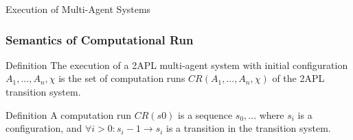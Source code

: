 \begin{frame}
\Huge{\centerline{Execution of Multi-Agent Systems}}
\end{frame}


\begin{frame}
\frametitle{Semantics of Computational Run }
\begin{block}{Definition}
	The execution of a 2APL multi-agent system with initial configuration $A_1,...,A_n, χ$ is the set of computation runs $CR(A_1,...,A_n, χ)$ of the 2APL transition system.
\end{block}


\begin{block}{Definition}
	A computation run $CR(s0)$ is a sequence $s_0,...$ where $s_i$ is a
configuration, and $∀i>0 : s_i−1 → s_i$ is a transition in the transition system.
\end{block}

\end{frame}



\begin{frame}
	\frametitle{Single-Agent Deliberation Cycle}
    \begin{figure}
      \texttt{[image: deliberation-cycle-individual-2apl]}}
    \end{figure}
\end{frame}